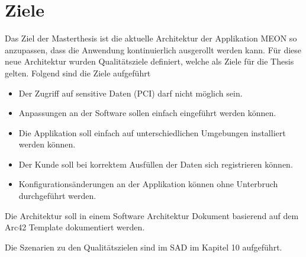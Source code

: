 \chapter{Ziele}

Das Ziel der Masterthesis ist die aktuelle Architektur der Applikation MEON so anzupassen, dass die Anwendung kontinuierlich ausgerollt werden kann. Für diese neue Architektur wurden Qualitätsziele definiert, welche als Ziele für die Thesis gelten. Folgend sind die Ziele aufgeführt

\begin{itemize}
	\item Der Zugriff auf sensitive Daten (PCI) darf nicht möglich sein.
	\item Anpassungen an der Software sollen einfach eingeführt werden können.
	\item Die Applikation soll einfach auf unterschiedlichen Umgebungen installiert werden können.
	\item Der Kunde soll bei korrektem Ausfüllen der Daten sich registrieren können.
	\item Konfigurationsänderungen an der Applikation können ohne Unterbruch durchgeführt werden.
\end{itemize}

Die Architektur soll in einem Software Architektur Dokument basierend auf dem Arc42 Template dokumentiert werden.

Die Szenarien zu den Qualitätszielen sind im SAD im Kapitel 10 aufgeführt.
